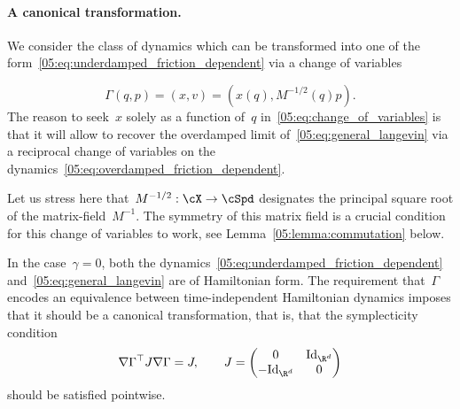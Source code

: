 \paragraph{A canonical transformation.}
We consider the class of dynamics which can be transformed into one of the form~\eqref{05:eq:underdamped_friction_dependent} via a change of variables

\begin{equation}
    \label{05:eq:change_of_variables}
    \Gamma(q,p) = \left(x,v\right) = \left(x(q),M^{-1/2}(q)p\right).
\end{equation}
The reason to seek~$x$ solely as a function of~$q$ in~\eqref{05:eq:change_of_variables} is that it will allow to recover the overdamped limit of~\eqref{05:eq:general_langevin} via a reciprocal change of variables on the dynamics~\eqref{05:eq:overdamped_friction_dependent}.

Let us stress here that~$M^{-1/2}:\cX\to\cSpd$ designates the principal square root of the matrix-field~$M^{-1}$. The symmetry of this matrix field is a crucial condition for this change of variables to work, see Lemma~\ref{05:lemma:commutation} below.

In the case~$\gamma=0$, both the dynamics~\eqref{05:eq:underdamped_friction_dependent} and~\eqref{05:eq:general_langevin} are of Hamiltonian form. The requirement that~$\Gamma$ encodes an equivalence between time-independent Hamiltonian dynamics imposes that it should be a canonical transformation, that is, that the symplecticity condition
\begin{equation}
    \label{05:eq:symplecticity}
    \nabla \Gamma^\top J \nabla\Gamma = J,\qquad J = \begin{pmatrix}
        0 & \mathrm{Id}_{\R^d}\\ -\mathrm{Id}_{\R^d}&0
    \end{pmatrix}
\end{equation}
should be satisfied pointwise.

